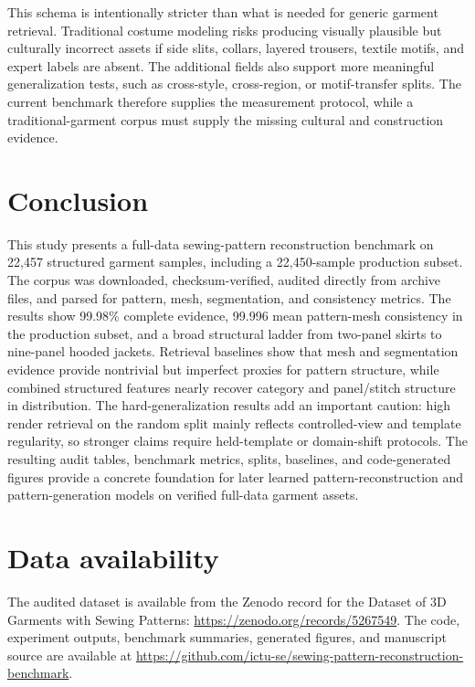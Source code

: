 \documentclass[pdflatex,sn-mathphys-num]{sn-jnl}
\begin{document}
This schema is intentionally stricter than what is needed for generic garment retrieval. Traditional costume modeling risks producing visually plausible but culturally incorrect assets if side slits, collars, layered trousers, textile motifs, and expert labels are absent. The additional fields also support more meaningful generalization tests, such as cross-style, cross-region, or motif-transfer splits. The current benchmark therefore supplies the measurement protocol, while a traditional-garment corpus must supply the missing cultural and construction evidence.

\section{Conclusion}\label{sec:conclusion}

This study presents a full-data sewing-pattern reconstruction benchmark on 22,457 structured garment samples, including a 22,450-sample production subset. The corpus was downloaded, checksum-verified, audited directly from archive files, and parsed for pattern, mesh, segmentation, and consistency metrics. The results show 99.98\% complete evidence, 99.996 mean pattern-mesh consistency in the production subset, and a broad structural ladder from two-panel skirts to nine-panel hooded jackets. Retrieval baselines show that mesh and segmentation evidence provide nontrivial but imperfect proxies for pattern structure, while combined structured features nearly recover category and panel/stitch structure in distribution. The hard-generalization results add an important caution: high render retrieval on the random split mainly reflects controlled-view and template regularity, so stronger claims require held-template or domain-shift protocols. The resulting audit tables, benchmark metrics, splits, baselines, and code-generated figures provide a concrete foundation for later learned pattern-reconstruction and pattern-generation models on verified full-data garment assets.

\backmatter

\section*{Data availability}
The audited dataset is available from the Zenodo record for the Dataset of 3D Garments with Sewing Patterns: \url{https://zenodo.org/records/5267549}. The code, experiment outputs, benchmark summaries, generated figures, and manuscript source are available at \url{https://github.com/ictu-se/sewing-pattern-reconstruction-benchmark}.


\end{document}
